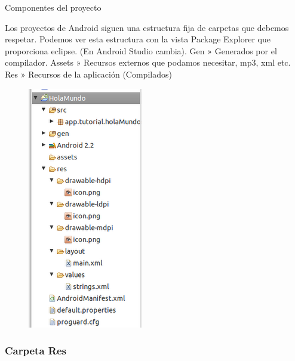 \documentclass{beamer}
\begin{document}
\begin{frame}{Componentes del proyecto}
\begin{block}{}
Los proyectos de Android siguen una estructura fija de carpetas que debemos respetar. Podemos ver esta estructura con la vista Package Explorer que proporciona eclipse. (En Android Studio cambia). Gen » Generados por el compilador. Assets » Recursos externos que podamos necesitar, mp3, xml etc. Res » Recursos de la aplicación (Compilados)
\begin{figure}[H]
\centering
\includegraphics[scale=.3]{./img/estructuraCarpetas.png}
\end{figure}
\end{block}
\end{frame}

\subsubsection{Carpeta Res}
\end{document}
